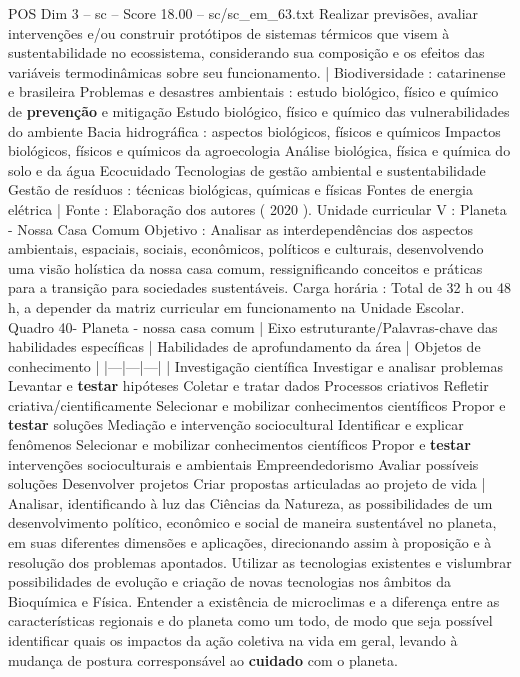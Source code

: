 \begin{textsample}{POS Dim 3 – sc – Score 18.00 – sc/sc\_em\_63.txt}
Realizar previsões, avaliar intervenções e/ou construir protótipos de sistemas térmicos que visem à sustentabilidade no ecossistema, considerando sua composição e os efeitos das variáveis termodinâmicas sobre seu funcionamento. | Biodiversidade : catarinense e brasileira Problemas e desastres ambientais : estudo biológico, físico e químico de \textbf{prevenção} e mitigação Estudo biológico, físico e químico das vulnerabilidades do ambiente Bacia hidrográfica : aspectos biológicos, físicos e químicos Impactos biológicos, físicos e químicos da agroecologia Análise biológica, física e química do solo e da água Ecocuidado Tecnologias de gestão ambiental e sustentabilidade Gestão de resíduos : técnicas biológicas, químicas e físicas Fontes de energia elétrica | Fonte : Elaboração dos autores ( 2020 ).
Unidade curricular V : Planeta - Nossa Casa Comum Objetivo : Analisar as interdependências dos aspectos ambientais, espaciais, sociais, econômicos, políticos e culturais, desenvolvendo uma visão holística da nossa casa comum, ressignificando conceitos e práticas para a transição para sociedades sustentáveis.
Carga horária : Total de 32 h ou 48 h, a depender da matriz curricular em funcionamento na Unidade Escolar.
Quadro 40- Planeta - nossa casa comum | Eixo estruturante/Palavras-chave das habilidades específicas | Habilidades de aprofundamento da área | Objetos de conhecimento | |---|---|---| | Investigação científica Investigar e analisar problemas Levantar e \textbf{testar} hipóteses Coletar e tratar dados Processos criativos Refletir criativa/cientificamente Selecionar e mobilizar conhecimentos científicos Propor e \textbf{testar} soluções Mediação e intervenção sociocultural Identificar e explicar fenômenos Selecionar e mobilizar conhecimentos científicos Propor e \textbf{testar} intervenções socioculturais e ambientais Empreendedorismo Avaliar possíveis soluções Desenvolver projetos Criar propostas articuladas ao projeto de vida | Analisar, identificando à luz das Ciências da Natureza, as possibilidades de um desenvolvimento político, econômico e social de maneira sustentável no planeta, em suas diferentes dimensões e aplicações, direcionando assim à proposição e à resolução dos problemas apontados.
Utilizar as tecnologias existentes e vislumbrar possibilidades de evolução e criação de novas tecnologias nos âmbitos da Bioquímica e Física.
Entender a existência de microclimas e a diferença entre as características regionais e do planeta como um todo, de modo que seja possível identificar quais os impactos da ação coletiva na vida em geral, levando à mudança de postura corresponsável ao \textbf{cuidado} com o planeta.

\end{textsample}
